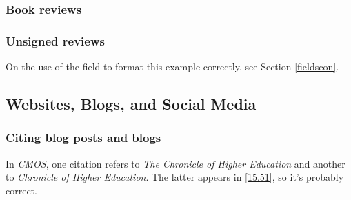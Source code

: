\documentclass[11pt,letterpaper,oneside]{article}
\begin{document}
\setcounter{subsubsection}{201}
\subsubsection{Book reviews}
\label{14.202}

\begin{citebib}
\item \cite[B13--B14]{ratliff1999}
\item \cite{kamp2006}
\item \cite{brehm2015}
\end{citebib}

\setcounter{subsubsection}{203}
\subsubsection{Unsigned reviews}
\label{14.204}

On the use of the  field to format this example
correctly, see Section \ref{fieldscon}.

\begin{citebib}
\item \cite{zeitung1828}
\end{citebib}

\setcounter{subsection}{6}
\subsection{Websites, Blogs, and Social Media}
\setcounter{subsection}{14}

\setcounter{subsubsection}{207}
\subsubsection{Citing blog posts and blogs}
\label{14.208}

In \textit{CMOS}, one citation refers to \textit{The Chronicle of
Higher Education} and another to \textit{Chronicle of Higher
Education}. The latter appears in \ref{15.51}, so it's probably
correct.

\begin{citebib}
\item \cite{amlen2015}
\item \cite{germano2017}
\item \cite{amlen}
\item \cite{linguafranca}
\item \cite{jim2017}
\end{citebib}
\end{document}
